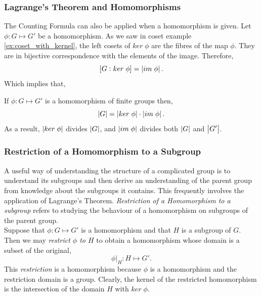 \documentclass[MathsNotesBase.tex]{subfiles}
\begin{document}
{	\subsubsection{Lagrange's Theorem and Homomorphisms}
	The Counting Formula can also be applied when a homomorphism is given. Let $\phi : G \longmapsto G'$ be a homomorphism. As we saw in coset example \ref{ex:coset_with_kernel}, the left cosets of $ker \; \phi$ are the fibres of the map $\phi$. They are in bijective correspondence with the elements of the image. Therefore,
	\[ [G : ker \; \phi] = \left\lvert im \; \phi\right\rvert. \]
	Which implies that,
	\begin{corollary}
		\label{coro:order_of_image_divides_both_order_of_domain_and_codomain}
		If $\phi : G \longmapsto G'$ is a homomorphism of finite groups then,
		\[ \left\lvert G\right\rvert = \left\lvert ker \; \phi\right\rvert \cdot \left\lvert im \; \phi\right\rvert. \]
		As a result, $\left\lvert ker \; \phi\right\rvert$ divides $\left\lvert G\right\rvert$, and $\left\lvert im \; \phi\right\rvert$ divides both $\left\lvert G\right\rvert$ and $\left\lvert G'\right\rvert$.
	\end{corollary}

	\bigskip
	\subsubsection{Restriction of a Homomorphism to a Subgroup}
	A useful way of understanding the structure of a complicated group is to understand its subgroups and then derive an understanding of the parent group from knowledge about the subgroups it contains. This frequently involves the application of Lagrange's Theorem. \textit{Restriction of a Homomorphism to a subgroup} refers to studying the behaviour of a homomorphism on subgroups of the parent group.\\
	Suppose that ${ \phi: G \longmapsto G' }$ is a homomorphism and that $H$ is a subgroup of $G$. Then we may \textit{restrict $\phi$ to $H$} to obtain a homomorphism whose domain is a subset of the original,
	\[ \phi \vert_H : H \longmapsto G'. \]
	This \textit{restriction} is a homomorphism because $\phi$ is a homomorphism and the restriction domain is a group. Clearly, the kernel of the restricted homomorphism is the intersection of the domain $H$ with ${ ker\;\phi }$.
	
	\smallskip
}
\end{document}
